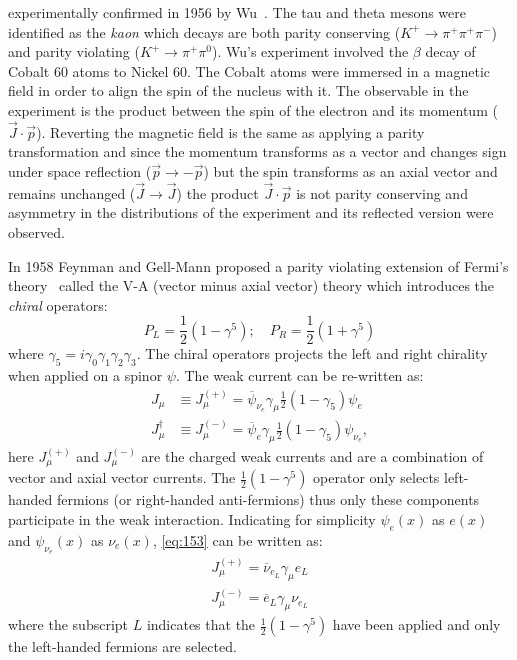 experimentally confirmed in 1956 by Wu~\cite{WuExperiment}. The tau and theta
mesons were identified as the \emph{kaon} which decays are both parity
conserving ($K^+ \rightarrow \pi^+ \pi^+ \pi^-$) and parity violating
($K^+ \rightarrow \pi^+ \pi^0$). Wu's experiment involved the $\beta$ decay of
Cobalt 60 atoms to Nickel 60. The Cobalt atoms were immersed in a magnetic field
in order to align the spin of the nucleus with it. The observable in the
experiment is the product between the spin of the electron and its momentum
($\vec{J} \cdot \vec{p}$). Reverting the magnetic field is the same as applying
a parity transformation and since the momentum transforms as a vector and
changes sign under space reflection ($\vec{p} \to - \vec{p}$) but the spin
transforms as an axial vector and remains unchanged ($\vec{J} \to \vec{J}$) the
product $\vec{J} \cdot \vec{p}$ is not parity conserving and asymmetry in the
distributions of the experiment and its reflected version were observed.

In 1958 Feynman and Gell-Mann proposed a parity violating extension of Fermi's
theory~\cite{VATheory} called the V-A (vector minus axial vector) theory which
introduces the \emph{chiral} operators:
\begin{equation}
  \label{eq:152}
  P_L = \frac{1}{2}(1 - \gamma^5); \quad P_R = \frac{1}{2}(1 + \gamma^5)
\end{equation}
where $\gamma_5 = i \gamma_0 \gamma_1 \gamma_2 \gamma_3$. The chiral operators
projects the left and right chirality when applied on a spinor $\psi$. The weak
current can be re-written as:
\begin{equation}
  \begin{split}
    J_\mu & \equiv J_\mu^{(+)} = \overbar{\psi}_{\nu_e} \gamma_\mu \frac{1}{2}
    \left(1 - \gamma_5 \right) \psi_e \\
    J_\mu^\dagger & \equiv J_\mu^{(-)} = \overbar{\psi}_e \gamma_\mu \frac{1}{2}
    (1 - \gamma_5) \psi_{\nu_e},
  \end{split}
  \label{eq:153}
\end{equation}
here $J_\mu^{(+)}$ and $J_\mu^{(-)}$ are the charged weak currents and are a
combination of vector and axial vector currents. The $\frac{1}{2}(1 - \gamma^5)$
operator only selects left-handed fermions (or right-handed anti-fermions) thus
only these components participate in the weak interaction. Indicating for
simplicity $\psi_e (x)$ as $e (x)$ and $\psi_{\nu_e} (x)$ as $\nu_e (x)$,
\cref{eq:153} can be written as:
\begin{equation}
  \begin{aligned}
    J_\mu^{(+)} = \overbar{\nu}_{e_L} \gamma_\mu e_L \\
    J_\mu^{(-)} = \overbar{e}_L \gamma_\mu \nu_{e_L}
  \end{aligned}
  \label{eq:177}
\end{equation}
where the subscript $L$ indicates that the $\frac{1}{2}(1 - \gamma^5)$ have been
applied and only the left-handed fermions are selected.

